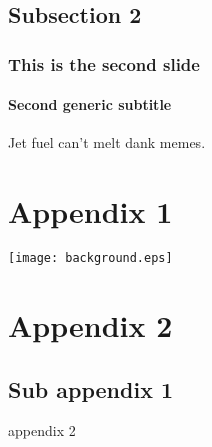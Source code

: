 	\subsection{Subsection 2}
	\begin{frame}
		\frametitle{This is the second slide}
		\framesubtitle{Second generic subtitle}		
		Jet fuel can't melt dank memes.		
	\end{frame}
	
	\appendix
	\section{Appendix 1}
	\begin{frame}
		\texttt{[image: background.eps]}
	\end{frame}
	\section{Appendix 2}
	\subsection{Sub appendix 1}
	\begin{frame}
		appendix 2
	\end{frame}
